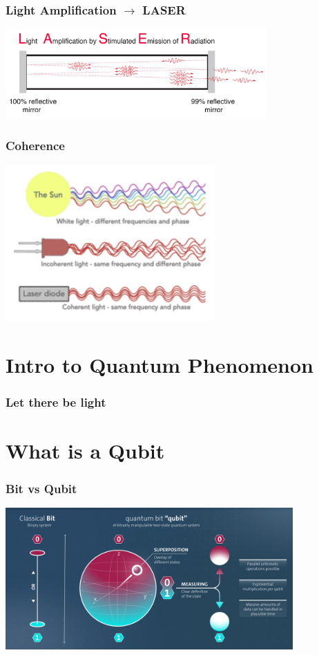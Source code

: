 \documentclass{beamer}
\begin{document}
\begin{frame}\frametitle{Light Amplification $\rightarrow$ LASER}
\begin{center}
\includegraphics[width=10cm]{fig/laser2.png}
\end{center}
\end{frame}

\begin{frame}\frametitle{Coherence}
\begin{center}
\includegraphics[width=8cm]{fig/laser3.jpg}
\end{center}
\end{frame}


\section{Intro to Quantum Phenomenon}

\begin{frame}\frametitle{Let there be light}

\end{frame}

\section{What is a Qubit}

\begin{frame} \frametitle{Bit vs Qubit}
\begin{center}
\includegraphics[width=11cm]{fig/bitQubit.png}
\end{center}

\end{frame}
\end{document}
